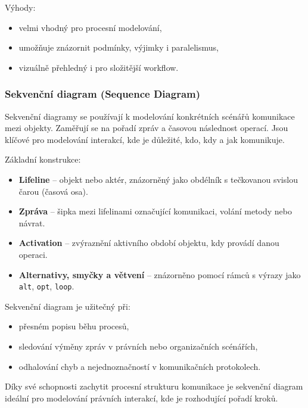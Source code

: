 Výhody:
\begin{itemize}
  \item velmi vhodný pro procesní modelování,
  \item umožňuje znázornit podmínky, výjimky i paralelismus,
  \item vizuálně přehledný i pro složitější workflow. \cite{PerglUML,Mlejnek2020Activity,Benabderrezak2024Activity}
\end{itemize}


\subsubsection{Sekvenční diagram (Sequence Diagram)}
\label{sec:sequence-diagram}

Sekvenční diagramy se používají k modelování konkrétních scénářů komunikace mezi objekty. Zaměřují se na pořadí zpráv a časovou následnost operací. Jsou klíčové pro modelování interakcí, kde je důležité, kdo, kdy a jak komunikuje. \cite{Benabderrezak2024Sequence}

Základní konstrukce:
\begin{itemize}
  \item \textbf{Lifeline} – objekt nebo aktér, znázorněný jako obdélník s tečkovanou svislou čarou (časová osa).
  \item \textbf{Zpráva} – šipka mezi lifelinami označující komunikaci, volání metody nebo návrat.
  \item \textbf{Activation} – zvýraznění aktivního období objektu, kdy provádí danou operaci.
  \item \textbf{Alternativy, smyčky a větvení} – znázorněno pomocí rámců s výrazy jako \texttt{alt}, \texttt{opt}, \texttt{loop}.
\end{itemize}

Sekvenční diagram je užitečný při:
\begin{itemize}
  \item přesném popisu běhu procesů,
  \item sledování výměny zpráv v právních nebo organizačních scénářích,
  \item odhalování chyb a nejednoznačností v komunikačních protokolech.
\end{itemize}

Díky své schopnosti zachytit procesní strukturu komunikace je sekvenční diagram ideální pro modelování právních interakcí, kde je rozhodující pořadí kroků. \cite{PerglUML,Benabderrezak2024Sequence}


